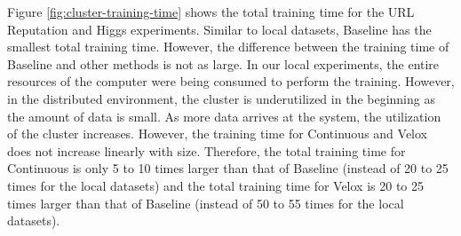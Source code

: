\documentclass{vldb}
\begin{document}
Figure \ref{fig:cluster-training-time} shows the total training time for the URL Reputation and Higgs experiments.
Similar to local datasets, Baseline has the smallest total training time.
However, the difference between the training time of Baseline and other methods is not as large.
In our local experiments, the entire resources of the computer were being consumed to perform the training.
However, in the distributed environment, the cluster is underutilized in the beginning as the amount of data is small.
As more data arrives at the system, the utilization of the cluster increases.
However, the training time for Continuous and Velox does not increase linearly with size.
Therefore, the total training time for Continuous is only 5 to 10 times larger than that of Baseline (instead of 20 to 25 times for the local datasets) and the total training time for Velox is 20 to 25 times larger than that of Baseline (instead of 50 to 55 times for the local datasets).
\end{document}
